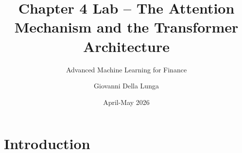 \documentclass[aspectratio=169]{beamer}
\title{Chapter 4 Lab -- The Attention Mechanism and the Transformer Architecture}
\subtitle{Advanced Machine Learning for Finance}
\author{Giovanni Della Lunga}
\institute{University of Bologna}
\date{April-May 2026}
\begin{document}
%
%
\begin{frame}
    \titlepage
\end{frame}
%
\section{Introduction}
%
%
%
\end{document}
